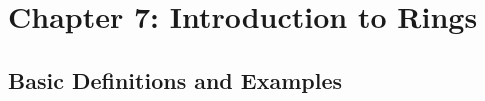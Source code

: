 \section{Chapter 7: Introduction to Rings}

\subsection{Basic Definitions and Examples}




\newpage